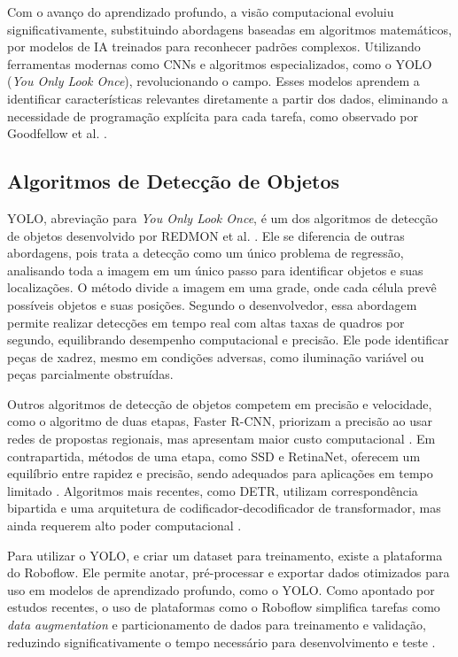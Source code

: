 \documentclass[journal]{IEEEtran} %
\begin{document}
Com o avanço do aprendizado profundo, a visão computacional evoluiu significativamente, substituindo abordagens baseadas em algoritmos matemáticos, por modelos de IA treinados para reconhecer padrões complexos. Utilizando ferramentas modernas como CNNs e algoritmos especializados, como o YOLO (\textit{You Only Look Once}), revolucionando o campo. Esses modelos aprendem a identificar características relevantes diretamente a partir dos dados, eliminando a necessidade de programação explícita para cada tarefa, como observado por Goodfellow et al. \cite{goodfellow2016}.

\subsection{Algoritmos de Detecção de Objetos}

YOLO, abreviação para \textit{You Only Look Once}, é um dos algoritmos de detecção de objetos desenvolvido por REDMON et al. \cite{redmon2016yolo}. Ele se diferencia de outras abordagens, pois trata a detecção como um único problema de regressão, analisando toda a imagem em um único passo para identificar objetos e suas localizações. O método divide a imagem em uma grade, onde cada célula prevê possíveis objetos e suas posições. Segundo o desenvolvedor, essa abordagem permite realizar detecções em tempo real com altas taxas de quadros por segundo, equilibrando desempenho computacional e precisão. Ele pode identificar peças de xadrez, mesmo em condições adversas, como iluminação variável ou peças parcialmente obstruídas.

Outros algoritmos de detecção de objetos competem em precisão e velocidade, como o algoritmo de duas etapas, Faster R-CNN, priorizam a precisão ao usar redes de propostas regionais, mas apresentam maior custo computacional \cite{ren2015faster}. Em contrapartida, métodos de uma etapa, como SSD e RetinaNet, oferecem um equilíbrio entre rapidez e precisão, sendo adequados para aplicações em tempo limitado \cite{liu2016ssd,lin2017focal}. Algoritmos mais recentes, como DETR, utilizam correspondência bipartida e uma arquitetura de codificador-decodificador de transformador, mas ainda requerem alto poder computacional \cite{carion2020detr}.

Para utilizar o YOLO, e criar um dataset para treinamento, existe a plataforma do Roboflow. Ele permite anotar, pré-processar e exportar dados otimizados para uso em modelos de aprendizado profundo, como o YOLO. Como apontado por estudos recentes, o uso de plataformas como o Roboflow simplifica tarefas como \textit{data augmentation} e particionamento de dados para treinamento e validação, reduzindo significativamente o tempo necessário para desenvolvimento e teste \cite{czyzewski2020}.
\end{document}
